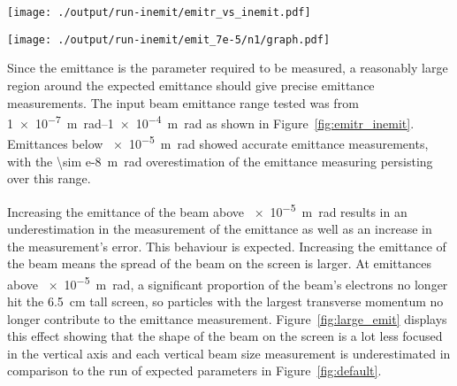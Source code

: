 \begin{figure*}%
	\begin{minipage}[t]{\columnwidth}
		\centering
		\texttt{[image: ./output/run-inemit/emitr\_vs\_inemit.pdf]}
		\caption{
			Plot of the ratio between the measured and true emittances of the beam
			against the true emittance of the beam.
			The blue line is the expected measurement value when taking into account
			the systematic overestimation due to discrete bins.
		}
		\label{fig:emitr_inemit}
	\end{minipage}\hfill
	\begin{minipage}[t]{\columnwidth}
		\centering
		\texttt{[image: ./output/run-inemit/emit\_7e-5/n1/graph.pdf]}
		\caption{
			Beam reconstruction for a large beam emittance of
			\SI{7e-5}{\meter\radian} showing the underestimation of the measured
			vertical beam sizes.
		}
		\label{fig:large_emit}
	\end{minipage}
\end{figure*}

Since the emittance is the parameter required to be measured, a reasonably large
region around the expected emittance should give precise emittance measurements.
The input beam emittance range tested was from \SIrange{1e-7}{1e-4}%
{\meter\radian} as shown in Figure~\ref{fig:emitr_inemit}. Emittances below
\SI{e-5}{\meter\radian} showed accurate emittance measurements, with the
\SI{\sim e-8}{\meter\radian} overestimation of the emittance measuring
persisting over this range.

Increasing the emittance of the beam above \SI{e-5}{\meter\radian} results in an
underestimation in the measurement of the emittance as well as an increase in
the measurement's error. This behaviour is expected. Increasing the emittance of
the beam means the spread of the beam on the screen is larger. At emittances
above \SI{e-5}{\meter\radian}, a significant proportion of the beam's electrons
no longer hit the \SI{6.5}{\centi\meter} tall screen, so particles with the
largest transverse momentum no longer contribute to the emittance measurement.
Figure~\ref{fig:large_emit} displays this effect showing that the shape of the
beam on the screen is a lot less focused in the vertical axis and each vertical
beam size measurement is underestimated in comparison to the run of expected
parameters in Figure~\ref{fig:default}.

